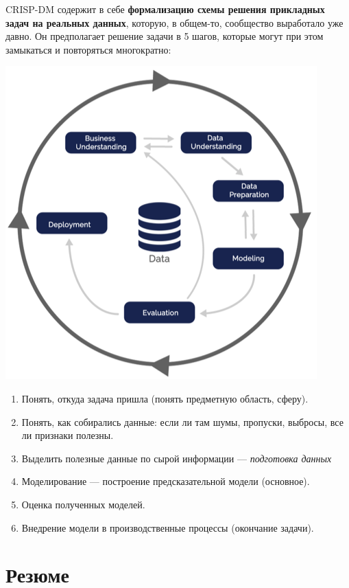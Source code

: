 \documentclass{article}
\begin{document}
CRISP-DM содержит в себе \textbf{формализацию схемы решения прикладных задач на реальных данных}, которую, в общем-то, сообщество выработало уже давно. Он предполагает решение задачи в 5 шагов, которые могут при этом замыкаться и повторяться многократно:

\begin{center}
    \includegraphics[scale=1]{images/2_6.png}
\end{center}

\begin{enumerate}
\item Понять, откуда задача пришла (понять предметную область, сферу).
\item Понять, как собирались данные: если ли там шумы, пропуски, выбросы, все ли признаки полезны.
\item Выделить полезные данные по сырой информации --- \textit{подготовка данных}
\item Моделирование --- построение предсказательной модели (основное).
\item Оценка полученных моделей.
\item Внедрение модели в производственные процессы (окончание задачи).
\end{enumerate}

\newpage
\section{Резюме}
\end{document}
